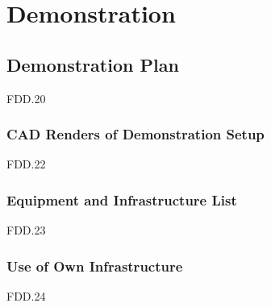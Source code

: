 \chapter{ Demonstration}


\section{Demonstration Plan}
FDD.20 

\subsection{CAD Renders of Demonstration Setup}
FDD.22 

\subsection{Equipment and Infrastructure List}
FDD.23 

\subsection{ Use of Own Infrastructure}
FDD.24
